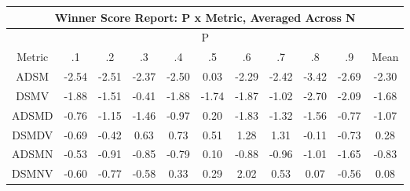 \documentclass[11pt,a4paper]{report}
\begin{document}
\begin{longtable}{ | c || c | c | c | c | c | c | c | c | c || c |}
\hline
\multicolumn{11}{|c|}{ Winner Score Report: P x Metric, Averaged Across N } \\
\hline
\multicolumn{11}{|c|}{ P } \\
\hline
Metric & .1 & .2 & .3 & .4 & .5 & .6 & .7 & .8 & .9 & Mean\\
\hline
\hline
\endhead
ADSM &  \cellcolor[HTML]{FFBFBF} -2.54 &  \cellcolor[HTML]{FFBFBF} -2.51 &  \cellcolor[HTML]{FFC7C7} -2.37 &  \cellcolor[HTML]{FFBFBF} -2.50 &  \cellcolor[HTML]{FFFFFF} 0.03 &  \cellcolor[HTML]{FFC7C7} -2.29 &  \cellcolor[HTML]{FFBFBF} -2.42 &  \cellcolor[HTML]{FFA7A7} -3.42 &  \cellcolor[HTML]{FFBFBF} -2.69 &  \cellcolor[HTML]{FFC7C7} -2.30 \\
DSMV &  \cellcolor[HTML]{FFCFCF} -1.88 &  \cellcolor[HTML]{FFD7D7} -1.51 &  \cellcolor[HTML]{FFF7F7} -0.41 &  \cellcolor[HTML]{FFCFCF} -1.88 &  \cellcolor[HTML]{FFD7D7} -1.74 &  \cellcolor[HTML]{FFCFCF} -1.87 &  \cellcolor[HTML]{FFE7E7} -1.02 &  \cellcolor[HTML]{FFB7B7} -2.70 &  \cellcolor[HTML]{FFC7C7} -2.09 &  \cellcolor[HTML]{FFD7D7} -1.68 \\
ADSMD &  \cellcolor[HTML]{FFEFEF} -0.76 &  \cellcolor[HTML]{FFDFDF} -1.15 &  \cellcolor[HTML]{FFD7D7} -1.46 &  \cellcolor[HTML]{FFE7E7} -0.97 &  \cellcolor[HTML]{F7F7FF} 0.20 &  \cellcolor[HTML]{FFCFCF} -1.83 &  \cellcolor[HTML]{FFDFDF} -1.32 &  \cellcolor[HTML]{FFD7D7} -1.56 &  \cellcolor[HTML]{FFEFEF} -0.77 &  \cellcolor[HTML]{FFE7E7} -1.07 \\
DSMDV &  \cellcolor[HTML]{FFEFEF} -0.69 &  \cellcolor[HTML]{FFF7F7} -0.42 &  \cellcolor[HTML]{EFEFFF} 0.63 &  \cellcolor[HTML]{EFEFFF} 0.73 &  \cellcolor[HTML]{EFEFFF} 0.51 &  \cellcolor[HTML]{DFDFFF} 1.28 &  \cellcolor[HTML]{DFDFFF} 1.31 &  \cellcolor[HTML]{FFFFFF} -0.11 &  \cellcolor[HTML]{FFEFEF} -0.73 &  \cellcolor[HTML]{F7F7FF} 0.28 \\
ADSMN &  \cellcolor[HTML]{FFEFEF} -0.53 &  \cellcolor[HTML]{FFE7E7} -0.91 &  \cellcolor[HTML]{FFE7E7} -0.85 &  \cellcolor[HTML]{FFEFEF} -0.79 &  \cellcolor[HTML]{FFFFFF} 0.10 &  \cellcolor[HTML]{FFE7E7} -0.88 &  \cellcolor[HTML]{FFE7E7} -0.96 &  \cellcolor[HTML]{FFE7E7} -1.01 &  \cellcolor[HTML]{FFD7D7} -1.65 &  \cellcolor[HTML]{FFE7E7} -0.83 \\
DSMNV &  \cellcolor[HTML]{FFEFEF} -0.60 &  \cellcolor[HTML]{FFEFEF} -0.77 &  \cellcolor[HTML]{FFEFEF} -0.58 &  \cellcolor[HTML]{F7F7FF} 0.33 &  \cellcolor[HTML]{F7F7FF} 0.29 &  \cellcolor[HTML]{CFCFFF} 2.02 &  \cellcolor[HTML]{EFEFFF} 0.53 &  \cellcolor[HTML]{FFFFFF} 0.07 &  \cellcolor[HTML]{FFEFEF} -0.56 &  \cellcolor[HTML]{FFFFFF} 0.08 \\

\end{longtable}
\end{document}
